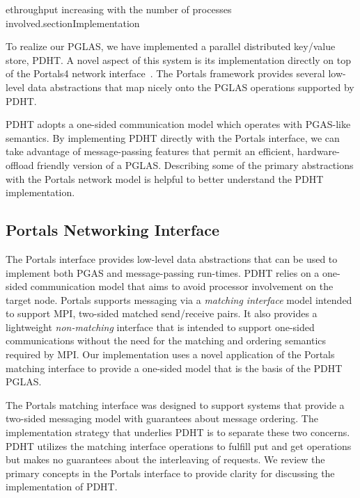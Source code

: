 ethroughput increasing with the number of processes involved.section{Implementation}

To realize our PGLAS, we have implemented a parallel distributed key/value store, 
PDHT. A novel aspect of this system is its implementation directly on top of the
Portals4 network interface~\cite{portals4}. The Portals framework provides several low-level 
data abstractions that map nicely onto the PGLAS operations supported by PDHT.

PDHT adopts a one-sided communication model which operates with PGAS-like
semantics. By implementing PDHT directly with the Portals interface, we can
take advantage of message-passing features that permit an efficient,
hardware-offload friendly version of a PGLAS. Describing
some of the primary abstractions with the Portals network model is helpful 
to better understand the PDHT implementation.

\subsection{Portals Networking Interface}


The Portals interface provides low-level data abstractions that can be used to
implement both PGAS and message-passing run-times. PDHT relies on a one-sided
communication model that aims to avoid processor involvement on the target
node. Portals supports messaging via a {\em matching interface} model intended to
support MPI, two-sided matched send/receive pairs. It also provides a
lightweight {\em non-matching} interface that is intended to support one-sided
communications without the need for the matching and ordering semantics
required by MPI. Our implementation uses a novel application of the Portals
matching interface to provide a one-sided model that is the basis of the PDHT
PGLAS. 

The Portals matching interface was designed to support systems that provide a
two-sided messaging model with guarantees about message ordering. The
implementation strategy that underlies PDHT is to separate these two concerns.
PDHT utilizes the matching interface operations to fulfill put and get
operations but makes no guarantees about the interleaving of requests. We
review the primary concepts in the Portals interface to provide clarity for
discussing the implementation of PDHT.


